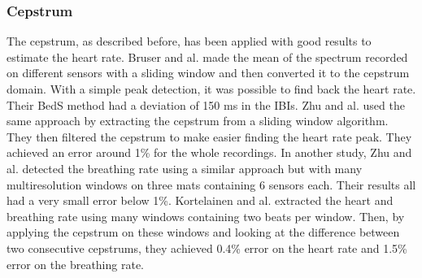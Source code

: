 \documentclass[twoside,twocolumn]{article}
\begin{document}
		
		
		\subsubsection{Cepstrum}
		The cepstrum, as described before, has been applied with good results to estimate the heart rate. Bruser and al. \cite{bruser_improvement_2015} made the mean of the spectrum recorded on different sensors with a sliding window and then converted it to the cepstrum domain. With a simple peak detection, it was possible to find back the heart rate. Their BedS method had a deviation of 150 ms in the IBIs.
		Zhu and al. \cite{zhu_heart_2014} used the same approach by extracting the cepstrum from a sliding window algorithm. They then filtered the cepstrum to make easier finding the heart rate peak. They achieved an error around 1\% for the whole recordings. 
		In another study, Zhu and al. \cite{zhu_estimating_2015} detected the breathing rate using a similar approach but with many multiresolution windows on three mats containing 6 sensors each. Their results all had a very small error below 1\%.
		Kortelainen and al. \cite{kortelainen_multichannel_2012} extracted the heart and breathing rate using many windows containing two beats per window. Then, by applying the cepstrum on these windows and looking at the difference between two consecutive cepstrums, they achieved 0.4\% error on the heart rate and 1.5\% error on the breathing rate.
		
\end{document}
